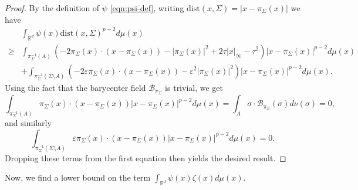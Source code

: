 \documentclass[preprint, reqno]{amsart}
\renewcommand{\epsilon}{\varepsilon}
\newcommand{\dist}{\mathrm{dist}}
\theoremstyle{definition}
\numberwithin{equation}{section}
\begin{document}
\begin{proof}
  By the definition of $\psi$ \eqref{eqn:psi-def}, writing $\dist(x,
  \Sigma) = \lvert x - \pi_\Sigma(x) \rvert$ we have
  \begin{align*}
    &  \int_{\mathbb{R}^d}\psi(x)\dist(x, \Sigma)^{p-2}d\mu(x)\\
    \ge
    & \int_{\pi_{\Sigma}^{-1}(A)}(-2\pi_{\Sigma}(x) \cdot (x -
      \pi_{\Sigma}(x)) - |\pi_{\Sigma}(x)|^2 + 2 \tau |x|_{\infty} -
      \tau^2)|x- \pi_{\Sigma}(x)|^{p-2} d\mu(x) \\
    &+ \int_{\pi_{\Sigma}^{-1}(\Sigma\setminus A)}(-2\epsilon
      \pi_{\Sigma}(x)\cdot (x - \pi_{\Sigma}(x)) - \epsilon^2
      |\pi_{\Sigma}(x)|^2)|x-\pi_{\Sigma}(x)|^{p-2}d\mu(x).
  \end{align*}
  Using the fact that the barycenter field
  $\mathcal{B}_{\pi_{\Sigma}}$ is trivial, we get
  \[
    \int_{\pi_{\Sigma}^{-1}(A)}\pi_{\Sigma}(x)\cdot (x -
    \pi_{\Sigma}(x))|x - \pi_{\Sigma}(x)|^{p-2}d\mu(x) =
    \int_{A}\sigma \cdot
    \mathcal{B}_{\pi_{\Sigma}}(\sigma)d\nu(\sigma) = 0,
  \]
  and similarly
  \[
    \int_{\pi_{\Sigma}^{-1}(\Sigma\setminus A)}\epsilon
    \pi_{\Sigma}(x)\cdot (x - \pi_{\Sigma}(x))|x -
    \pi_{\Sigma}(x)|^{p-2}d\mu(x) =0.
  \]
  Dropping these terms from the first equation then yields the
  desired result.
\end{proof}
Now, we find a lower bound on the term $\int_{\mathbb{R}^d} \psi(x)
\zeta(x) d\mu(x)$.
\end{document}
